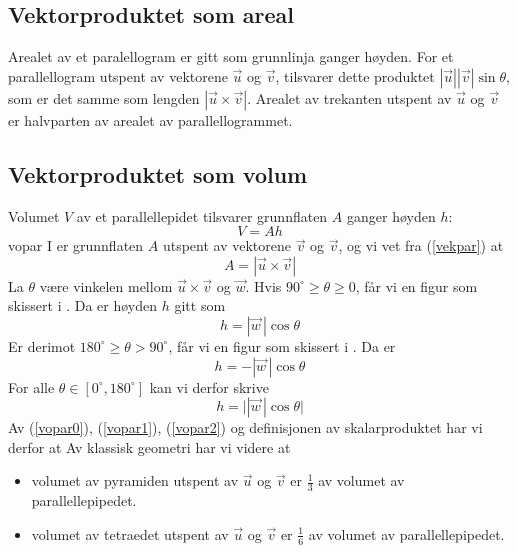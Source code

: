 \subsection*{Vektorproduktet som areal}
Arealet av et paralellogram er gitt som grunnlinja ganger høyden. For et parallellogram utspent av vektorene $ \vec{u} $ og $ \vec{v} $, tilsvarer dette produktet $ |\vec{u}||\vec{v}|\sin \theta $, som er det samme som lengden $ |\vec{u}\times\vec{v}| $. Arealet av trekanten utspent av $ \vec u $ og $ \vec{v} $ er halvparten av arealet av parallellogrammet.
\newpage
\subsection*{Vektorproduktet som volum \label{vekprsomvolforkl}}
Volumet $ V $ av et parallellepidet tilsvarer grunnflaten $ A $ ganger høyden $ h $:
\begin{equation}
V = Ah \label{vopar0}
\end{equation}
{vopar}
I  er grunnflaten $ A $ utspent av vektorene $ \vec{v} $ og $ \vec{v} $, og vi vet fra (\ref{vekpar}) at
\begin{equation}
A = |\vec{u}\times\vec{v}|  \label{vopar1}
\end{equation}
La $ \theta $ være vinkelen mellom  $ \vec{u}\times\vec{v} $ og $ \vec{w} $. Hvis $ {90^\circ\geq\theta\geq0} $, får vi en figur som skissert i . Da er høyden $ h $ gitt som
\[ h = |\vec{w}\,|\cos \theta \]
Er derimot $ {180^\circ\geq\theta>90^\circ} $, får vi en figur som skissert i . Da er
\[ h = -|\vec{w}\,|\cos \theta \]
For alle $ \theta\in[0^\circ, 180^\circ] $ kan vi derfor skrive
\begin{equation}
h = \big| |\vec{w}\,|\cos \theta \big| \label{vopar2}
\end{equation}
Av (\ref{vopar0}), (\ref{vopar1}), (\ref{vopar2}) og definisjonen av skalarproduktet har vi derfor at\vs
{}
Av klassisk geometri har vi videre at
\begin{itemize}
	\item volumet av pyramiden utspent av $ \vec{u} $ og $ \vec{v} $ er $ \frac{1}{3} $ av volumet av parallellepipedet.
	\item volumet av tetraedet utspent av $ \vec{u} $ og $ \vec{v} $ er $ \frac{1}{6} $ av volumet av parallellepipedet.
\end{itemize} 
